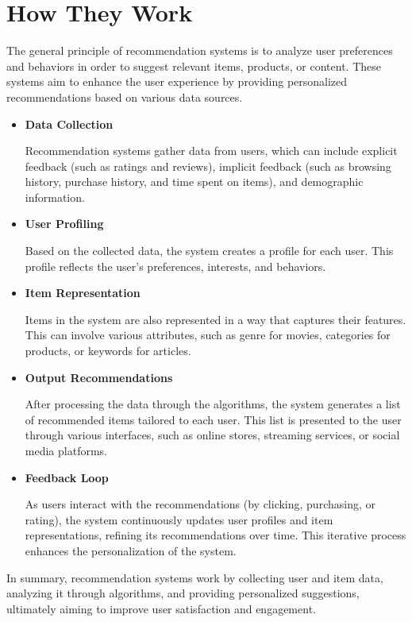 \documentclass[10pt,twoside,slovak,a4paper]{article}
\begin{document}
\section{How They Work} \label{How They Work}
The general principle of recommendation systems is to analyze user preferences and behaviors in order to suggest relevant items, products, or content. These systems aim to enhance the user experience by providing personalized recommendations based on various data sources.

\begin{itemize}
\newpage
\item \textbf{Data Collection}

Recommendation systems gather data from users, which can include explicit feedback (such as ratings and reviews), implicit feedback (such as browsing history, purchase history, and time spent on items), and demographic information.
\item \textbf{User Profiling}

Based on the collected data, the system creates a profile for each user. This profile reflects the user’s preferences, interests, and behaviors.
\item \textbf{Item Representation}

 Items in the system are also represented in a way that captures their features. This can involve various attributes, such as genre for movies, categories for products, or keywords for articles.
\item \textbf{Output Recommendations}

 After processing the data through the algorithms, the system generates a list of recommended items tailored to each user. This list is presented to the user through various interfaces, such as online stores, streaming services, or social media platforms.
 \item \textbf{Feedback Loop}
 
 As users interact with the recommendations (by clicking, purchasing, or rating), the system continuously updates user profiles and item representations, refining its recommendations over time. This iterative process enhances the personalization of the system.
\end{itemize}

In summary, recommendation systems work by collecting user and item data, analyzing it through algorithms, and providing personalized suggestions, ultimately aiming to improve user satisfaction and engagement.
\end{document}
